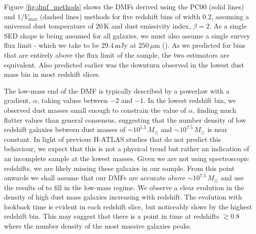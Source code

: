 Figure \ref{fig:dmf_methods} shows the DMFs derived using the PC00 (solid lines) and $1/V_{\textrm{max}}$ (dashed lines) methods for five redshift bins of width $0.2$, assuming a universal dust temperature of $20\,$K and dust emissivity index, $\beta = 2$. As a single SED shape is being assumed for all galaxies, we must also assume a single survey flux limit - which we take to be $29.4\,$mJy at $250\,\mu$m (\citealt{Valiante_2016}). As we predicted for bins that are entirely above the flux limit of the sample, the two estimators are equivalent. Also predicted earlier was the downturn observed in the lowest dust mass bin in most redshift slices.

The low-mass end of the DMF is typically described by a powerlaw with a gradient, $\alpha$, taking values between $-2$ and $-1$. In the lowest redshift bin, we observed dust masses small enough to constrain the value of $\alpha$, finding much flatter values than general consensus, suggesting that the number density of low redshift galaxies between dust masses of $\sim 10^{5.5}\,M_{\odot}$ and $\sim 10^{7.5}\,M_{\odot}$ is near constant. In light of previous H-ATLAS studies that do not predict this behaviour, we expect that this is not a physical trend but rather an indication of an incomplete sample at the lowest masses. Given we are not using spectroscopic redshifts, we are likely missing these galaxies in our sample. From this point onwards we shall assume that our DMFs are accurate above $\sim 10^{7.5}\,M_{\odot}$ and use the results of \citealt{Beeston_2018} to fill in the low-mass regime. We observe a clear evolution in the density of high dust mass galaxies increasing with redshift. The evolution with lookback time is evident in each redshift slice, but noticeably slows by the highest redshift bin. This may suggest that there is a point in time at redshifts $\gtrsim 0.8$ where the number density of the most massive galaxies peaks. 

